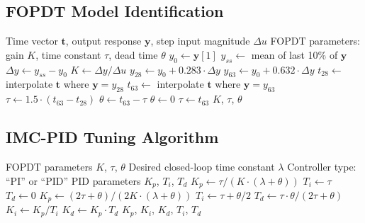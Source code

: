 \subsection{FOPDT Model Identification}
\label{subsec:fopdt_algorithm}

\begin{algorithm}[H]
\caption{FOPDT Parameter Identification from Step Response}
\label{alg:fopdt_id}
\begin{algorithmic}[1]
\REQUIRE Time vector $\mathbf{t}$, output response $\mathbf{y}$, step input magnitude $\Delta u$
\ENSURE FOPDT parameters: gain $K$, time constant $\tau$, dead time $\theta$
\STATE
\STATE {}
\STATE $y_0 \gets \mathbf{y}[1]$ 
\STATE $y_{ss} \gets$ mean of last 10\% of $\mathbf{y}$ 
\STATE $\Delta y \gets y_{ss} - y_0$
\STATE
\STATE {}
\STATE $K \gets \Delta y / \Delta u$
\STATE
\STATE {}
\STATE $y_{28} \gets y_0 + 0.283 \cdot \Delta y$
\STATE $y_{63} \gets y_0 + 0.632 \cdot \Delta y$
\STATE
\STATE $t_{28} \gets$ interpolate $\mathbf{t}$ where $\mathbf{y} = y_{28}$
\STATE $t_{63} \gets$ interpolate $\mathbf{t}$ where $\mathbf{y} = y_{63}$
\STATE
\STATE {}
\STATE $\tau \gets 1.5 \cdot (t_{63} - t_{28})$
\STATE $\theta \gets t_{63} - \tau$
\STATE
\STATE {}
    \STATE $\theta \gets 0$
    \STATE $\tau \gets t_{63}$
\ENDIF
\STATE
\RETURN $K$, $\tau$, $\theta$
\end{algorithmic}
\end{algorithm}

\subsection{IMC-PID Tuning Algorithm}
\label{subsec:imc_tuning_algorithm}

\begin{algorithm}[H]
\caption{IMC-PID Tuning for FOPDT Process}
\label{alg:imc_tuning}
\begin{algorithmic}[1]
\REQUIRE FOPDT parameters $K$, $\tau$, $\theta$
\REQUIRE Desired closed-loop time constant $\lambda$
\REQUIRE Controller type: ``PI'' or ``PID''
\ENSURE PID parameters $K_p$, $T_i$, $T_d$
\STATE
{}
    \STATE $K_p \gets \tau / (K \cdot (\lambda + \theta))$
    \STATE $T_i \gets \tau$
    \STATE $T_d \gets 0$
    \STATE $K_p \gets (2\tau + \theta) / (2K \cdot (\lambda + \theta))$
    \STATE $T_i \gets \tau + \theta/2$
    \STATE $T_d \gets \tau \cdot \theta / (2\tau + \theta)$
\ENDIF
\STATE
\STATE {}
\STATE $K_i \gets K_p / T_i$
\STATE $K_d \gets K_p \cdot T_d$
\STATE
\RETURN $K_p$, $K_i$, $K_d$, $T_i$, $T_d$
\end{algorithmic}
\end{algorithm}

